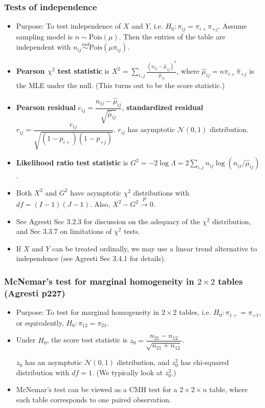 \documentclass[twoside]{article}
\newcommand\dis{\displaystyle}
\newcommand\calN{\mathcal{N}}
\newcommand\Lmb{\Lambda}
\newcommand\goesto{\rightarrow}
\begin{document}
\subsubsection*{Tests of independence}
\begin{itemize}
\item Purpose: To test independence of $X$ and $Y$, i.e. $H_0: \pi_{ij} = \pi_{i+} \pi_{+j}$. Assume sampling model is $n \sim \text{Pois}(\mu)$. Then the entries of the table are independent with $n_{ij} \stackrel{ind}{\sim} \text{Pois}(\mu \pi_{ij})$.

\item \textbf{Pearson $\chi^2$ test statistic} is $X^2 = \dis\sum_{i,j}\frac{(n_{ij} - \hat{\mu}_{ij})^2}{\hat{\mu}_{ij}}$, where $\hat{\mu}_{ij} = n \hat{\pi}_{i+}\hat{\pi}_{+j}$ is the MLE under the null. (This turns out to be the score statistic.)

\item \textbf{Pearson residual} $e_{ij} = \dfrac{n_{ij} - \hat{\mu}_{ij}}{\sqrt{\hat{\mu}_{ij}}}$, \textbf{standardized residual} $r_{ij} = \dfrac{e_{ij}}{\sqrt{(1-p_{i+})(1-p_{+j})}}$. $r_{ij}$ has asymptotic $\calN(0,1)$ distribution.

\item \textbf{Likelihood ratio test statistic} is $G^2 = - 2 \log \Lmb = 2 \dis\sum_{i,j}n_{ij} \log (n_{ij}/\hat{\mu}_{ij})$.

\item Both $X^2$ and $G^2$ have asymptotic $\chi^2$ distributions with $df = (I-1)(J-1)$. Also, $X^2 - G^2 \stackrel{P}{\goesto} 0$.

\item See Agresti Sec 3.2.3 for discussion on the adequacy of the $\chi^2$ distribution, and Sec 3.3.7 on limitations of $\chi^2$ tests.

\item If $X$ and $Y$ can be treated ordinally, we may use a linear trend alternative to independence (see Agresti Sec 3.4.1 for details).

\end{itemize}


\subsubsection*{McNemar's test for marginal homogeneity in $2 \times 2$ tables (Agresti p227)}
\begin{itemize}
\item Purpose: To test for marginal homogeneity in $2 \times 2$ tables, i.e. $H_0: \pi_{1+} = \pi_{+1}$, or equivalently, $H_0: \pi_{12} = \pi_{21}$.

\item Under $H_0$, the score test statistic is
$z_0 = \dfrac{n_{21} - n_{12}}{\sqrt{n_{21} + n_{12}}}$.

$z_0$ has an asymptotic $\calN(0,1)$ distribution, and $z_0^2$ has chi-squared distribution with $df = 1$. (We typically look at $z_0^2$.)

\item McNemar's test can be viewed as a CMH test for a $2 \times 2 \times n$ table, where each table corresponds to one paired observation.
\end{itemize}
\end{document}
